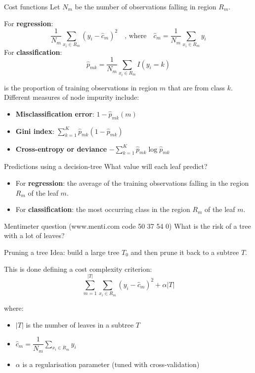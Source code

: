 \documentclass[notes]{beamer}          %
\begin{document}
\begin{frame}{Cost functions}
Let $N_m$ be the number of observations falling in region $R_m$.

For \textbf{regression}:
$$\dfrac{1}{N_m}\sum_{x_i\in R_m}(y_i-\hat c_m)^2  \quad \mbox{, where} \quad \hat c_m = \dfrac{1}{N_m}\sum_{x_i\in R_m}y_i$$
For \textbf{classification}:
\begin{equation*}
	\hat{p}_{mk}=\dfrac{1}{N_m}\sum_{x_i\in R_m}I(y_i=k)
\end{equation*}

is the proportion of training observations in region $m$ that are from class $k$. Different measures of node impurity include:
\begin{itemize}
\item  \textbf{Misclassification error}: $1-\hat{p}_{mk}(m)$
\item  \textbf{Gini index}: $\sum_{k=1}^K\hat{p}_{mk}(1-\hat{p}_{mk})$
\item  \textbf{Cross-entropy or deviance} $-\sum_{k=1}^K\hat{p}_{mk}\log\hat{p}_{mk}$
\end{itemize}
\end{frame}


\begin{frame}{Predictions using a decision-tree}
What value will each leaf predict?
\begin{itemize}
	\item For \textbf{regression}: the average of the  training observations falling in the region $R_m$ of the leaf $m$.
		\item For \textbf{classification}: the most occurring class in the region $R_m$ of the leaf $m$.
\end{itemize}

\vspace{0.5cm}

\end{frame}

\begin{frame}{Mentimeter question (www.menti.com code 50 37 54 0)}
What is the risk of a tree with a lot of leaves?
\end{frame}

\begin{frame}{Pruning a tree}
Idea: build a large tree $T_0$ and then prune it back to a subtree $T$.

This is done defining a cost complexity criterion:
$$\sum_{m=1}^{|T|}\sum_{x_i\in R_m}(y_i-\hat c_m)^2+\alpha|T|$$

where:
\begin{itemize}
\item $|T|$ is the number of leaves in a subtree $T$
\item $ \hat c_m = \dfrac{1}{N_m}\sum_{x_i\in R_m}y_i$
\item $\alpha$ is a regularisation parameter (tuned with cross-validation)
\end{itemize}
\end{frame}
\end{document}
